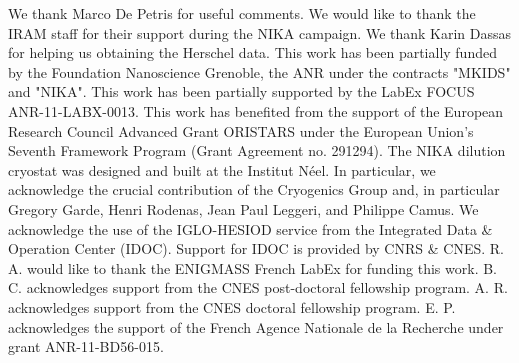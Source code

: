 \documentclass[twocolumn,traditabstract]{aa}
\begin{document}
\begin{acknowledgements}
We thank Marco De Petris for useful comments.
We would like to thank the IRAM staff for their support during the NIKA campaign.
We thank Karin Dassas for helping us obtaining the Herschel data.
This work has been partially funded by the Foundation Nanoscience Grenoble, the ANR under the contracts "MKIDS" and "NIKA". 
This work has been partially supported by the LabEx FOCUS ANR-11-LABX-0013. 
This work has benefited from the support of the European Research Council Advanced Grant ORISTARS under the European Union's Seventh Framework Program (Grant Agreement no. 291294).
The NIKA dilution cryostat was designed and built at the Institut N\'eel. In particular, we acknowledge the crucial contribution of the Cryogenics Group and, in particular Gregory Garde, Henri Rodenas, Jean Paul Leggeri, and Philippe Camus. 
We acknowledge the use of the IGLO-HESIOD service from the Integrated Data \& Operation Center (IDOC). Support for IDOC is provided by CNRS \& CNES. 
R. A. would like to thank the ENIGMASS French LabEx for funding this work. 
B. C. acknowledges support from the CNES post-doctoral fellowship program. 
A. R. acknowledges support from the CNES doctoral fellowship program. 
E. P. acknowledges the support of the French Agence Nationale de la Recherche under grant ANR-11-BD56-015.
\end{acknowledgements}


\end{document}
